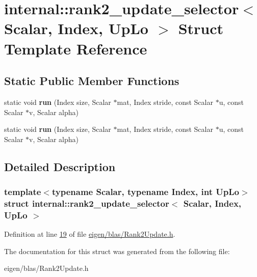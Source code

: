 \hypertarget{structinternal_1_1rank2__update__selector}{}\section{internal\+:\+:rank2\+\_\+update\+\_\+selector$<$ Scalar, Index, Up\+Lo $>$ Struct Template Reference}
\label{structinternal_1_1rank2__update__selector}
\subsection*{Static Public Member Functions}
\begin{DoxyCompactItemize}
\item 
\mbox{\label{structinternal_1_1rank2__update__selector_ac00ce4e52dd3827c28b587b5dc792774}} 
static void {\bfseries run} (Index size, Scalar $\ast$mat, Index stride, const Scalar $\ast$u, const Scalar $\ast$v, Scalar alpha)
\item 
\mbox{\label{structinternal_1_1rank2__update__selector_ac00ce4e52dd3827c28b587b5dc792774}} 
static void {\bfseries run} (Index size, Scalar $\ast$mat, Index stride, const Scalar $\ast$u, const Scalar $\ast$v, Scalar alpha)
\end{DoxyCompactItemize}


\subsection{Detailed Description}
\subsubsection*{template$<$typename Scalar, typename Index, int Up\+Lo$>$\newline
struct internal\+::rank2\+\_\+update\+\_\+selector$<$ Scalar, Index, Up\+Lo $>$}



Definition at line \hyperlink{eigen_2blas_2_rank2_update_8h_source_l00019}{19} of file \hyperlink{eigen_2blas_2_rank2_update_8h_source}{eigen/blas/\+Rank2\+Update.\+h}.



The documentation for this struct was generated from the following file\+:\begin{DoxyCompactItemize}
\item 
eigen/blas/\+Rank2\+Update.\+h\end{DoxyCompactItemize}
